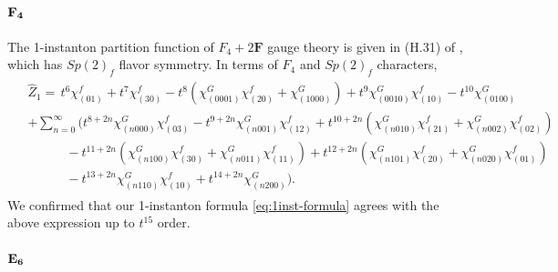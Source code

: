 \documentclass[letterpaper, 11pt]{article}
\begin{document}
{\paragraph{$\bf F_4$}
The 1-instanton partition function of $F_4 + 2 \mathbf{F}$ gauge theory is given in (H.31) of \cite{DelZotto:2018tcj}, which has $Sp(2)_f$ flavor symmetry. In terms of $F_4$ and $Sp(2)_f$ characters, 
\begin{align}
    \label{eq:F4F2}
\begin{split}
  & \hat{Z}_1 =\,t^6\chi^f_{(01)}+t^7\chi^{f}_{(30)}-t^8\left(\chi^G_{(0001)}\chi^f_{(20)}+\chi^G_{(1000)}\right)+t^9\chi^G_{(0010)}\chi^f_{(10)}-t^{10}\chi^G_{(0100)}\\
  &+\sum_{n=0}^{\infty}\Bigg(t^{8+2n}\chi^G_{(n000)}\chi^f_{(03)}-t^{9+2n}\chi^G_{(n001)}\chi^f_{(12)}+t^{10+2n}\left(\chi^G_{(n010)}\chi^f_{(21)}+\chi^G_{(n002)}\chi^f_{(02)}\right)\\
  &\qquad\quad-t^{11+2n}\left(\chi^G_{(n100)}\chi^f_{(30)}+\chi^G_{(n011)}\chi^f_{(11)}\right) 
  +t^{12+2n}\left(\chi^G_{(n101)}\chi^f_{(20)}+\chi^G_{(n020)}\chi^f_{(01)}\right)\\
  &\qquad\quad-t^{13+2n}\chi^G_{(n110)}\chi^f_{(10)}+t^{14+2n}\chi^G_{(n200)}\Bigg).
\end{split}
\end{align}
We confirmed that our 1-instanton formula \eqref{eq:1inst-formula} agrees with the above expression up to $t^{15}$ order. 


\paragraph{$\bf E_6$}

}
\end{document}
